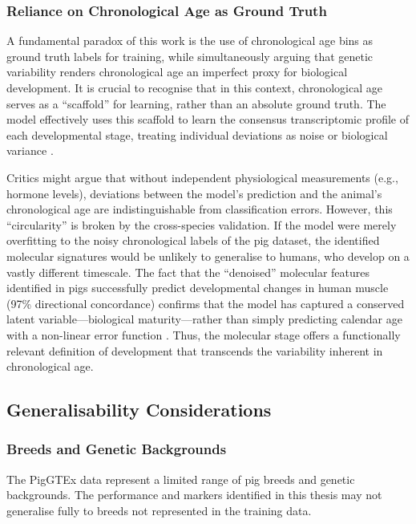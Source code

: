 \subsubsection{Reliance on Chronological Age as Ground Truth}

A fundamental paradox of this work is the use of chronological age bins as ground truth labels for training, while simultaneously arguing that genetic variability renders chronological age an imperfect proxy for biological development. It is crucial to recognise that in this context, chronological age serves as a ``scaffold'' for learning, rather than an absolute ground truth. The model effectively uses this scaffold to learn the consensus transcriptomic profile of each developmental stage, treating individual deviations as noise or biological variance \parencite{natarajan_learning_2013}.

Critics might argue that without independent physiological measurements (e.g., hormone levels), deviations between the model's prediction and the animal's chronological age are indistinguishable from classification errors. However, this ``circularity'' is broken by the cross-species validation. If the model were merely overfitting to the noisy chronological labels of the pig dataset, the identified molecular signatures would be unlikely to generalise to humans, who develop on a vastly different timescale. The fact that the ``denoised'' molecular features identified in pigs successfully predict developmental changes in human muscle (97\% directional concordance) confirms that the model has captured a conserved latent variable---biological maturity---rather than simply predicting calendar age with a non-linear error function \parencite{cardoso-moreira_gene_2019}. Thus, the molecular stage offers a functionally relevant definition of development that transcends the variability inherent in chronological age.

\subsection{Generalisability Considerations}

\subsubsection{Breeds and Genetic Backgrounds}

The PigGTEx data represent a limited range of pig breeds and genetic backgrounds. The performance and markers identified in this thesis may not generalise fully to breeds not represented in the training data.


